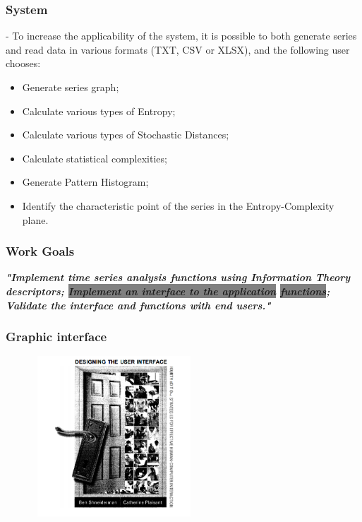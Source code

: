 \documentclass[10pt, compress]{beamer}
\begin{document}
\begin{frame}[fragile]
\frametitle{System}

- To increase the applicability of the system, it is possible to both generate series and read data in various formats (TXT, CSV or XLSX), and the following user chooses:

\begin{itemize}
\item Generate series graph;
\item Calculate various types of Entropy;
\item Calculate various types of Stochastic Distances;
\item Calculate statistical complexities;
\item Generate Pattern Histogram;
\item Identify the characteristic point of the series in the Entropy-Complexity plane.
\end{itemize}

\end{frame}

\begin{frame}[fragile]
\frametitle{Work Goals}
\begin{sloppypar}
\textit{\textbf{\Large "Implement time series analysis functions using Information Theory descriptors; \colorbox{gray}{Implement an interface to the application}
\colorbox{gray}{functions}; Validate the interface and functions with end users."}}
\end{sloppypar}
\end{frame}

\begin{frame}[fragile]
\frametitle{Graphic interface}
\begin{figure}
  \centering
   \includegraphics[width=6cm,height=6cm]{interface.png}
\end{figure}
\end{frame}
\end{document}
